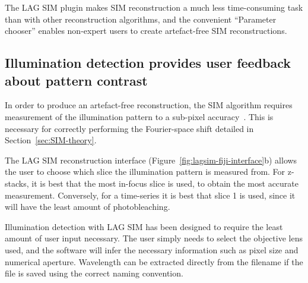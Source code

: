 The LAG SIM plugin makes SIM reconstruction a much less time-consuming task than with other reconstruction algorithms, and the convenient ``Parameter chooser'' enables non-expert users to create artefact-free SIM reconstructions. 


\subsection{Illumination detection provides user feedback about pattern contrast}\label{sec:LAGSIM-illumination-detection}
In order to produce an artefact-free reconstruction, the SIM algorithm requires measurement of the illumination pattern to a sub-pixel accuracy~\cite{muller2016open}. 
This is necessary for correctly performing the Fourier-space shift detailed in Section~\ref{sec:SIM-theory}. 

The LAG SIM reconstruction interface (Figure~\ref{fig:lagsim-fiji-interface}b) allows the user to choose which slice the illumination pattern is measured from. 
For z-stacks, it is best that the most in-focus slice is used, to obtain the most accurate measurement. 
Conversely, for a time-series it is best that slice 1 is used, since it will have the least amount of photobleaching. 

Illumination detection with LAG SIM has been designed to require the least amount of user input necessary. 
The user simply needs to select the objective lens used, and the software will infer the necessary information such as pixel size and numerical aperture. 
Wavelength can be extracted directly from the filename if the file is saved using the correct naming convention. 

